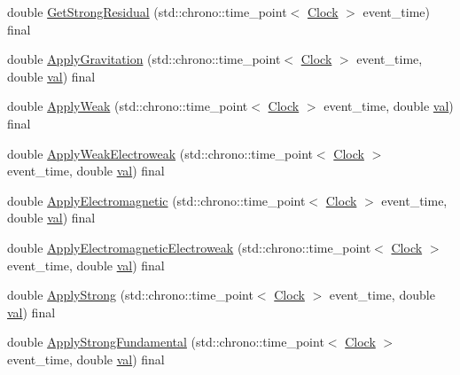 \begin{DoxyCompactItemize}
\item 
double \mbox{\hyperlink{class_solid_a9cfde1c3a4b7c6d2a5a3719d74e27237}{Get\+Strong\+Residual}} (std\+::chrono\+::time\+\_\+point$<$ \mbox{\hyperlink{universe_8h_a0ef8d951d1ca5ab3cfaf7ab4c7a6fd80}{Clock}} $>$ event\+\_\+time) final
\item 
double \mbox{\hyperlink{class_solid_af2b3133138ce2482faa462d07aa23042}{Apply\+Gravitation}} (std\+::chrono\+::time\+\_\+point$<$ \mbox{\hyperlink{universe_8h_a0ef8d951d1ca5ab3cfaf7ab4c7a6fd80}{Clock}} $>$ event\+\_\+time, double \mbox{\hyperlink{glad_8h_a26942fd2ed566ef553eae82d2c109c8f}{val}}) final
\item 
double \mbox{\hyperlink{class_solid_a49e35bf258104b7bce225dc21058affb}{Apply\+Weak}} (std\+::chrono\+::time\+\_\+point$<$ \mbox{\hyperlink{universe_8h_a0ef8d951d1ca5ab3cfaf7ab4c7a6fd80}{Clock}} $>$ event\+\_\+time, double \mbox{\hyperlink{glad_8h_a26942fd2ed566ef553eae82d2c109c8f}{val}}) final
\item 
double \mbox{\hyperlink{class_solid_ad6c28ec896cbcf64e24a7132a144befd}{Apply\+Weak\+Electroweak}} (std\+::chrono\+::time\+\_\+point$<$ \mbox{\hyperlink{universe_8h_a0ef8d951d1ca5ab3cfaf7ab4c7a6fd80}{Clock}} $>$ event\+\_\+time, double \mbox{\hyperlink{glad_8h_a26942fd2ed566ef553eae82d2c109c8f}{val}}) final
\item 
double \mbox{\hyperlink{class_solid_ab546d607d6f0bf70dc5e6bbac8baf287}{Apply\+Electromagnetic}} (std\+::chrono\+::time\+\_\+point$<$ \mbox{\hyperlink{universe_8h_a0ef8d951d1ca5ab3cfaf7ab4c7a6fd80}{Clock}} $>$ event\+\_\+time, double \mbox{\hyperlink{glad_8h_a26942fd2ed566ef553eae82d2c109c8f}{val}}) final
\item 
double \mbox{\hyperlink{class_solid_a46702e3109994b310eb4f1fba5610e0b}{Apply\+Electromagnetic\+Electroweak}} (std\+::chrono\+::time\+\_\+point$<$ \mbox{\hyperlink{universe_8h_a0ef8d951d1ca5ab3cfaf7ab4c7a6fd80}{Clock}} $>$ event\+\_\+time, double \mbox{\hyperlink{glad_8h_a26942fd2ed566ef553eae82d2c109c8f}{val}}) final
\item 
double \mbox{\hyperlink{class_solid_a0801ec0382bc509191575bcf9f5c83c1}{Apply\+Strong}} (std\+::chrono\+::time\+\_\+point$<$ \mbox{\hyperlink{universe_8h_a0ef8d951d1ca5ab3cfaf7ab4c7a6fd80}{Clock}} $>$ event\+\_\+time, double \mbox{\hyperlink{glad_8h_a26942fd2ed566ef553eae82d2c109c8f}{val}}) final
\item 
double \mbox{\hyperlink{class_solid_abd8fff76385306f97aa65dfd6b867fc6}{Apply\+Strong\+Fundamental}} (std\+::chrono\+::time\+\_\+point$<$ \mbox{\hyperlink{universe_8h_a0ef8d951d1ca5ab3cfaf7ab4c7a6fd80}{Clock}} $>$ event\+\_\+time, double \mbox{\hyperlink{glad_8h_a26942fd2ed566ef553eae82d2c109c8f}{val}}) final

\end{DoxyCompactItemize}
